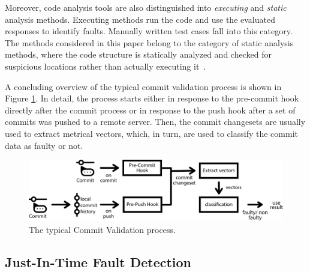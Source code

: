 Moreover, code analysis tools are also distinguished into \textit{executing} and \textit{static} analysis methods. Executing methods run the code and use the evaluated responses to identify faults. Manually written test cases fall into this category. The methods considered in this paper belong to the category of static analysis methods, where the code structure is statically analyzed and checked for suspicious locations rather than actually executing it~\cite{Wichmann1995}.

A concluding overview of the typical commit validation process is shown in Figure \ref{fig:cvprocess}. In detail, the process starts either in response to the pre-commit hook directly after the commit process or in response to the push hook after a set of commits was pushed to a remote server. Then, the commit changesets are usually used to extract metrical vectors, which, in turn, are used to classify the commit data as faulty or not.

\begin{figure}[t]
	\centering
	\includegraphics[width=\textwidth]{images/commitvalidation-process/typicalprocess-pdf}
	\caption{The typical Commit Validation process.}
	\label{fig:cvprocess}
\end{figure}

\subsection{Just-In-Time Fault Detection}


